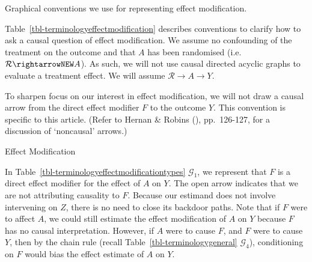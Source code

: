 \documentclass[
  single column]{article}
\begin{document}
\begin{table}

\caption{\label{tbl-terminologyeffectmodification}Graphical conventions
we use for representing effect modification.}

\centering{

\terminologyeffectmodification

}

\end{table}%

Table~\ref{tbl-terminologyeffectmodification} describes conventions to
clarify how to ask a causal question of effect modification. We assume
no confounding of the treatment on the outcome and that \(A\) has been
randomised (i.e.~\(\mathcal{R} \rightarrowNEW A\)). As such, we will not
use causal directed acyclic graphs to evaluate a treatment effect. We
will assume \(\mathcal{R}  \to A \to Y\).

To sharpen focus on our interest in effect modification, we will not
draw a causal arrow from the direct effect modifier \(F\) to the outcome
\(Y\). This convention is specific to this article. (Refer to Hernan \&
Robins (), pp.~126-127, for a
discussion of `noncausal' arrows.)

\begin{table}

\caption{\label{tbl-terminologyeffectmodificationtypes}Effect
Modification}

\centering{

\terminologyeffectmodificationtypes

}

\end{table}%

In Table~\ref{tbl-terminologyeffectmodificationtypes} \(\mathcal{G}_1\),
we represent that \(F\) is a direct effect modifier for the effect of
\(A\) on \(Y\). The open arrow indicates that we are not attributing
causality to \(F\). Because our estimand does not involve intervening on
\(Z\), there is no need to close its backdoor paths. Note that if \(F\)
were to affect \(A\), we could still estimate the effect modification of
\(A\) on \(Y\) because \(F\) has no causal interpretation. However, if
\(A\) were to cause \(F\), and \(F\) were to cause \(Y\), then by the
chain rule (recall Table~\ref{tbl-terminologygeneral}
\(\mathcal{G}_4\)), conditioning on \(F\) would bias the effect estimate
of \(A\) on \(Y\).
\end{document}
